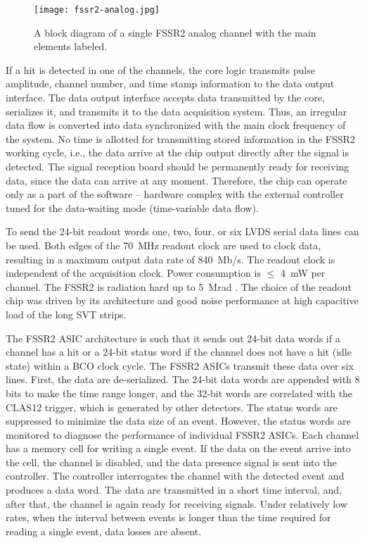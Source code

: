 \begin{figure}[hbt] 
\centering 
\texttt{[image: fssr2-analog.jpg]}
\caption{A block diagram of a single FSSR2 analog channel with the main elements labeled.}
\label{fig:fssr2-analog}
\end{figure}

If a hit is detected in one of the channels, the core logic transmits pulse amplitude, channel number, and time stamp
information to the data output interface. The data output interface accepts data transmitted by the core, serializes
it, and transmits it to the data acquisition system. Thus, an irregular data flow is converted into data synchronized
with the main clock frequency of the system. No time is allotted for transmitting stored information in the FSSR2
working cycle, i.e., the data arrive at the chip output directly after the signal is detected. The signal reception board
should be permanently ready for receiving data, since the data can arrive at any moment. Therefore, the chip can
operate only as a part of the software -- hardware complex with the external controller tuned for the data-waiting
mode (time-variable data flow). 

To send the 24-bit readout words one, two, four, or six LVDS serial data lines can be used. Both edges of the
70~MHz readout clock are used to clock data, resulting in a maximum output data rate of 840~Mb/s. The readout
clock is independent of the acquisition clock. Power consumption is $\le$ 4~mW per channel. The FSSR2 is radiation
hard up to 5~Mrad \cite{DINARDOTHESIS}. The choice of the readout chip was driven by its architecture and good
noise performance at high capacitive load of the long SVT strips.

The FSSR2 ASIC architecture is such that it sends out 24-bit data words if a channel has a hit or a 24-bit status
word if the channel does not have a hit (idle state) within a BCO clock cycle. The FSSR2 ASICs transmit these data
over six lines. First, the data are de-serialized. The 24-bit data words are appended with 8 bits to make the time
range longer, and the 32-bit words are correlated with the CLAS12 trigger, which is generated by other detectors.
The status words are suppressed to minimize the data size of an event. However, the status words are monitored to
diagnose the performance of individual FSSR2 ASICs. Each channel has a memory cell for writing a single event. If
the data on the event arrive into the cell, the channel is disabled, and the data presence signal is sent into the
controller. The controller interrogates the channel with the detected event and produces a data word. The data are
transmitted in a short time interval, and, after that, the channel is again ready for receiving signals. Under relatively
low rates, when the interval between events is longer than the time required for reading a single event, data losses
are absent. 

